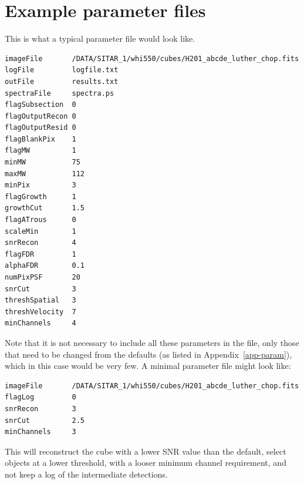 \documentclass[12pt,a4paper]{article}
\begin{document}
\newpage
\section{Example parameter files}
\label{app-input}

This is what a typical parameter file would look like.

\begin{verbatim}
imageFile       /DATA/SITAR_1/whi550/cubes/H201_abcde_luther_chop.fits
logFile         logfile.txt
outFile         results.txt
spectraFile     spectra.ps
flagSubsection  0
flagOutputRecon 0
flagOutputResid 0
flagBlankPix    1
flagMW          1
minMW           75
maxMW           112
minPix          3
flagGrowth      1
growthCut       1.5
flagATrous      0
scaleMin        1
snrRecon        4
flagFDR         1
alphaFDR        0.1
numPixPSF       20
snrCut          3
threshSpatial   3
threshVelocity  7
minChannels     4
\end{verbatim}

Note that it is not necessary to include all these parameters in the
file, only those that need to be changed from the defaults (as listed
in Appendix~\ref{app-param}), which in this case would be very few. A
minimal parameter file might look like:
\begin{verbatim}
imageFile       /DATA/SITAR_1/whi550/cubes/H201_abcde_luther_chop.fits
flagLog         0
snrRecon        3
snrCut          2.5
minChannels     3
\end{verbatim}
This will reconstruct the cube with a lower SNR value than the
default, select objects at a lower threshold,  with a looser minimum
channel requirement, and not keep a log of the intermediate
detections. 
\end{document}
